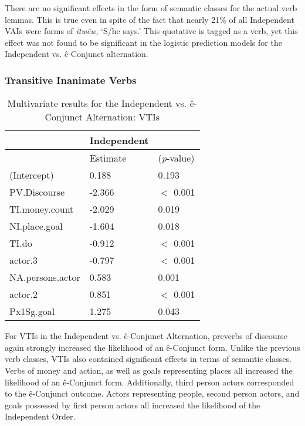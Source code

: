        There are no significant effects in the form of semantic classes for the actual verb lemmas. This is true even in spite of the fact that nearly 21\% of all Independent VAIs were forms of \textit{itwêw}, `S/he says.' This quotative is tagged as a  verb, yet this effect was not found to be significant in the logistic prediction models for the Independent vs. ê-Conjunct alternation.  


            
            
            
    \subsubsection{Transitive Inanimate Verbs}
            \begin{table}[H]
            \centering
            \begin{tabular}{lll}
            \toprule
                                    & \textbf{Independent} \\
                    \midrule
                & Estimate   & (\textit{p}-value) &   \\
            \midrule
(Intercept) & 0.188 & 0.193 \\
PV.Discourse     & -2.366 & $<$ 0.001 \\
TI.money.count   & -2.029 & 0.019 \\
NI.place.goal    & -1.604 & 0.018 \\
TI.do            & -0.912   & $<$ 0.001 \\
actor.3          & -0.797 & $<$ 0.001 \\
NA.persons.actor & 0.583 & 0.001 \\
actor.2          & 0.851  & $<$ 0.001 \\
Px1Sg.goal       & 1.275 & 0.043 \\
            \bottomrule
            \end{tabular}
            \caption{
               Multivariate results for the Independent vs. ê-Conjunct Alternation: VTIs \\ \label{tab:tiivcmv}
              }
            \end{table}
        
        For VTIs in the Independent vs. ê-Conjunct Alternation, preverbs of discourse again strongly increased the likelihood of an ê-Conjunct form. Unlike the previous verb classes, VTIs also contained significant effects in terms of semantic classes. Verbs of money and action, as well as goals representing places all increased the likelihood of an ê-Conjunct form. Additionally, third person actors corresponded to the ê-Conjunct outcome. Actors representing people, second person actors, and goals possessed by first person actors all increased the likelihood of the Independent Order. 
        


